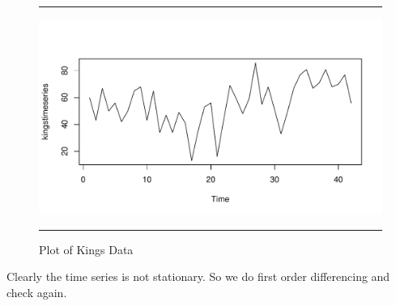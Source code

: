 \documentclass[11pt, letterpaper, twoside]{memoir}\usepackage{knitr}
\begin{document}
\begin{figure}
\centering
\rule{4in}{1pt}
\begin{knitrout}
\color{fgcolor}\begin{kframe}
\begin{alltt}
 \hlkwb{<-} \hlstd{(}\hlstd{,}\hlstd{=}\hlstd{)}
 \hlkwb{<-}  
 
\end{alltt}
\end{kframe}
\includegraphics[width=\maxwidth]{figure/unnamed-chunk-119-1} 

\end{knitrout}
\caption{Plot of Kings Data}
\label{Fig:plotking}
\rule{4in}{1pt}
\end{figure}

Clearly the time series is not stationary. So we do first order differencing and check again.
\end{document}
